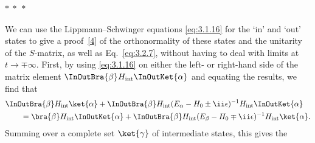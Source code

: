 \begin{center}
$*\ *\ *$
\end{center}

We can use the Lippmann--Schwinger equations \eqref{eq:3.1.16} for the `in' and `out'
states to give a proof~\hyperref[ref:3.4]{[4]} of the orthonormality of these states and the
unitarity of the $S$-matrix, as well as Eq.~\eqref{eq:3.2.7}, without having to deal
with limits at $t\to\mp\infty$. First, by using \eqref{eq:3.1.16} on either the left-
or right-hand side of the matrix element
$\InOutBra{\beta}H_{\mathrm{int}}\InOutKet{\alpha}$ and equating the results,
we find that
\begin{align*}
&\InOutBra{\beta}H_{\mathrm{int}}\ket{\alpha}
+\InOutBra{\beta}
H_{\mathrm{int}}(E_\alpha-H_0\mathbin{\pm}\ii\epsilon)^{-1}
H_{\mathrm{int}}\InOutKet{\alpha}
\\
&\qquad={}
\bra{\beta}H_{\mathrm{int}}\InOutKet{\alpha}
+\InOutBra{\beta}
H_{\mathrm{int}}(E_\beta-H_0\mathbin{\mp}\ii\epsilon)^{-1}
H_{\mathrm{int}}\ket{\alpha}.
\end{align*}
Summing over a complete set $\ket{\gamma}$ of intermediate states, this gives
the
